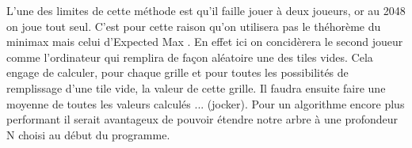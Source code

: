 \documentclass{article}
\begin{document}
L'une des limites de cette m\'ethode est qu'il faille jouer \`a deux joueurs, or au 2048 on joue tout seul. C'est pour cette raison qu'on utilisera pas le th\'ehor\`eme du \og minimax \fg{} mais celui d'\og Expected Max \fg{}. En effet ici on concid\`erera le second joueur comme l'ordinateur qui remplira de façon aléatoire une des tiles vides. Cela engage de calculer, pour chaque grille et pour toutes les possibilit\'es de remplissage d'une tile vide, la valeur de cette grille. Il faudra ensuite faire une moyenne de toutes les valeurs calculés ... (jocker). Pour un algorithme encore plus performant il serait avantageux de pouvoir \'etendre notre arbre \`a une profondeur N choisi au d\'ebut du programme. 
\end{document}
